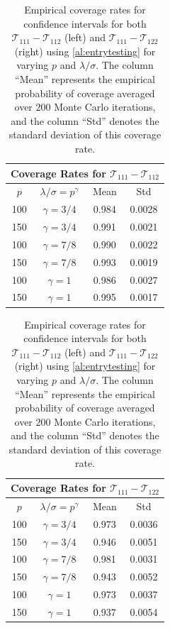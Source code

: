 \documentclass[10pt]{article}
\newcommand{\0}{{\mathbf{0}}}
\newcommand{\1}{{\mathbf{1}}}
\begin{document}
\begin{table}[htb]
    \centering
    \begin{tabular}{|c|c | c | c |}
    \hline 
\multicolumn{4}{|c|}{Coverage Rates for $\mathcal{T}_{111}- \mathcal{T}_{112}$}   \\ [1ex]
\hline 
  $p$ & $ \lambda/\sigma = p^{\gamma}$ & Mean  & Std  \\
  \hline 

  
  100 & $\gamma = 3/4$ & 0.984&  0.0028 
\\ 
\hline 
  
 150 & $\gamma =  3/4$ &   0.991  
   &  0.0021
\\
\hline 
  
 100 & $\gamma = 7/8$ &   0.990 
 & 0.0022
\\
\hline 
  
 150 & $\gamma = 7/8$ & 0.993 
  &   0.0019
 \\
 \hline 
  
 100  & $\gamma = 1$ &  0.986   
&  0.0027
\\\hline 
  
 150  & $\gamma =  1$ &0.995  & 0.0017 
\\ \hline 
  
\end{tabular} 
\hspace{20pt}
\begin{tabular}{|c|c | c | c |}
      \hline 
\multicolumn{4}{|c|}{Coverage Rates for $\mathcal{T}_{111} - \mathcal{T}_{122}$}   \\ [1ex]
\hline 
  $p$ & $ \lambda/\sigma = p^{\gamma}$ & Mean  & Std  \\
  \hline 
  100 & $\gamma = 3/4$ & 0.973   &  0.0036 
\\ 
\hline 
  
 150 & $\gamma =  3/4$ &0.946    &   0.0051 
\\
\hline 
  
 100 & $\gamma = 7/8$ &  0.981   &  0.0031
\\
\hline 
  
 150 & $\gamma = 7/8$ & 0.943   &   0.0052
 \\
 \hline 
  
 100  & $\gamma = 1$ & 0.973    &   0.0037 
\\\hline 
  
 150  & $\gamma =  1$ & 0.937  &  0.0054
\\ \hline 
  
\end{tabular}
    \caption{Empirical coverage rates for confidence intervals for both  $\mathcal{T}_{111} - \mathcal{T}_{112}$ (left) and $\mathcal{T}_{111} - \mathcal{T}_{122}$ (right) using \cref{al:entrytesting} for varying $p$ and $\lambda/\sigma$.   The column ``Mean'' represents the empirical probability of coverage averaged over $200$ Monte Carlo iterations, and the column ``Std'' denotes the standard deviation of this coverage rate.}
    \label{fig:entrywiseci}
\end{table}
\end{document}
